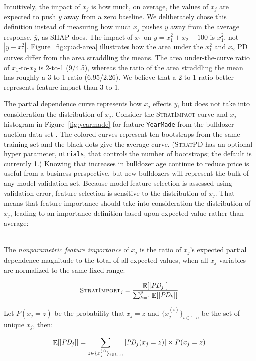 \documentclass[11pt]{article}
\newcommand{\figref}[1]{Figure~\ref{#1}}
\DeclareMathOperator{\Ex}{\mathbb{E}}
\newcommand{\simp}{\fontfamily{cmr}\textsc{\small StratImpact}}
\newcommand{\simpo}{\fontfamily{cmr}\textsc{\small StratImport}}
\newcommand{\spd}{\fontfamily{cmr}\textsc{\small StratPD}}
\begin{document}
Intuitively, the impact of $x_j$ is how much, on average, the values of $x_j$ are expected to push $y$ away from a zero baseline. We deliberately chose this  definition instead of measuring how much $x_j$ pushes $y$ away from the average response, $\overline{y}$, as SHAP does. The impact of $x_1$ on $y = x_1^2+x_2+100$ is $x_1^2$, not $|\overline{y} - x_1^2|$.  \figref{fig:quad-area} illustrates how the area under the $x_1^2$ and $x_2$ PD curves differ from the area straddling the means. The area under-the-curve ratio of $x_1$-to-$x_2$ is 2-to-1 (9/4.5), whereas the ratio of the area straddling the mean has roughly a 3-to-1 ratio (6.95/2.26). We believe that a 2-to-1 ratio better represents feature impact than 3-to-1.

The partial dependence curve represents how $x_j$ effects $y$, but does not take into consideration the distribution of $x_j$.  Consider the \simp{} curve and $x_j$ histogram in \figref{fig:yearmade} for feature {\tt\small YearMade} from the bulldozer auction data set \citep{bulldozer}. The colored curves represent ten bootstraps from the same training set and the black dots give the average curve. (\spd{} has an optional hyper parameter, {\tt\small ntrials}, that controls the number of bootstraps; the default is currently 1.) Knowing that increases in bulldozer age continue to reduce price is useful from a business perspective, but new bulldozers will represent the bulk of any model validation set.  Because model feature selection is assessed using  validation error, feature selection is sensitive to the distribution of $x_j$. That means that feature importance should take into consideration the distribution of $x_j$, leading to an importance definition based upon expected value rather than average:

~\\
 The {\em nonparametric feature importance} of $x_j$ is the ratio of $x_j$'s expected partial dependence magnitude to the total of all expected values, when all $x_j$ variables are normalized to the same fixed range:

\begin{equation}\label{eq:Epd2b}
\simpo_j = \frac{\Ex[|\text{\it PD}_j|]}{\sum_{k=1}^p \Ex[|\text{\it PD}_k|]}
\end{equation}

\noindent Let $P(x_j = z)$ be the probability that $x_j=z$ and $\{x_j^{(i)}\}_{i \in 1..n}$ be the set of unique $x_j$, then:


\begin{equation}\label{eq:Epd2c}
\Ex[|\text{\it PD}_j|] = \sum_{z \in \{x_j^{(i)}\}_{i \in 1..n}} |\text{\it PD}_j(x_j = z)| \times P(x_j=z)
\end{equation}
\end{document}
